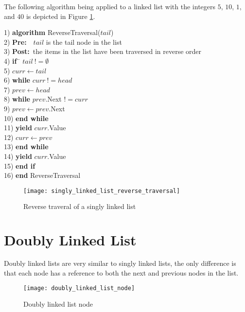 The following algorithm being applied to a linked list with the integers $5$, $10$, $1$, and $40$ is depicted in Figure \ref{fig:singly_linked_list_reverse_traversal}.

\begin{tabbing}
1)  \textbf{alg}\= \textbf{orithm} ReverseTraversal($tail$) \\
2)  \> \textbf{Pre:}~~$tail$ is the tail node in the list \\
3)  \> \textbf{Post:}~the items in the list have been traversed in reverse order \\
4)  \> \textbf{if}~\= $tail~!= \emptyset$ \\
5)  \> \> $curr \leftarrow tail$ \\
6)  \> \> \textbf{whi}\= \textbf{le} $curr~!= head$ \\
7)  \> \> \> $prev \leftarrow head$ \\
8)  \> \> \> \textbf{whi}\= \textbf{le} $prev$.Next $!= curr$ \\
9)  \> \> \> \> $prev \leftarrow prev$.Next \\
10) \> \> \> \textbf{end while} \\
11) \> \> \> \textbf{yield} $curr$.Value \\
12) \> \> \> $curr \leftarrow prev$ \\
13) \> \> \textbf{end while} \\
14) \> \> \textbf{yield} $curr$.Value \\
15) \> \textbf{end if} \\
16) \textbf{end} ReverseTraversal \\
\end{tabbing}

\begin{figure}
\begin{center}
\texttt{[image: singly\_linked\_list\_reverse\_traversal]}
\end{center}
\caption{Reverse traveral of a singly linked list} \label{fig:singly_linked_list_reverse_traversal}
\end{figure}

\section{Doubly Linked List}
Doubly linked lists are very similar to singly linked lists, the only difference is that each node has a reference to both the next and previous nodes in the list.

\begin{figure}
\begin{center}
\texttt{[image: doubly\_linked\_list\_node]}
\end{center}
\caption{Doubly linked list node}
\end{figure}


